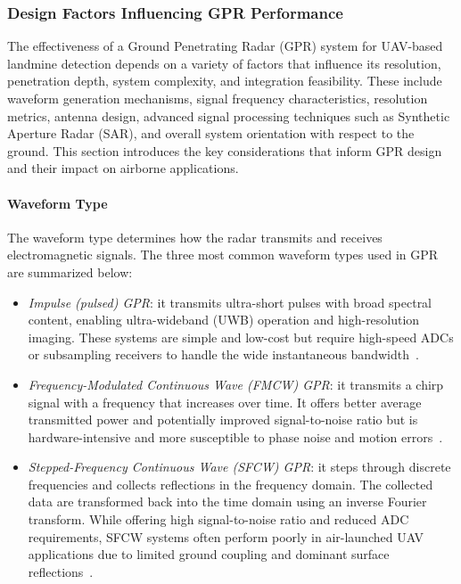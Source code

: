 \subsubsection{Design Factors Influencing GPR Performance}

The effectiveness of a Ground Penetrating Radar (GPR) system for UAV-based landmine detection depends on a variety of factors that influence its resolution, penetration depth, system complexity, and integration feasibility. These include waveform generation mechanisms, signal frequency characteristics, resolution metrics, antenna design, advanced signal processing techniques such as Synthetic Aperture Radar (SAR), and overall system orientation with respect to the ground. This section introduces the key considerations that inform GPR design and their impact on airborne applications.

\paragraph{Waveform Type}

The waveform type determines how the radar transmits and receives electromagnetic signals. The three most common waveform types used in GPR are summarized below:

\begin{itemize}
    \item \textit{Impulse (pulsed) GPR}: it transmits ultra-short pulses with broad spectral content, enabling ultra-wideband (UWB) operation and high-resolution imaging. These systems are simple and low-cost but require high-speed ADCs or subsampling receivers to handle the wide instantaneous bandwidth~\cite{chen2023ground,sipos2017drone}.
    \item \textit{Frequency-Modulated Continuous Wave (FMCW) GPR}: it transmits a chirp signal with a frequency that increases over time. It offers better average transmitted power and potentially improved signal-to-noise ratio but is hardware-intensive and more susceptible to phase noise and motion errors~\cite{burr2018design}.
    \item \textit{Stepped-Frequency Continuous Wave (SFCW) GPR}: it steps through discrete frequencies and collects reflections in the frequency domain. The collected data are transformed back into the time domain using an inverse Fourier transform. While offering high signal-to-noise ratio and reduced ADC requirements, SFCW systems often perform poorly in air-launched UAV applications due to limited ground coupling and dominant surface reflections~\cite{tronca2018comparison}.
\end{itemize}


